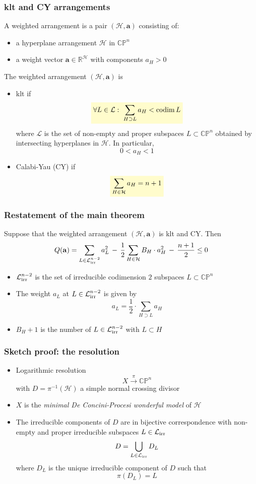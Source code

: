 \documentclass{beamer}
\newcommand{\R}{\mathbb{R}}
\newcommand{\CP}{\mathbb{CP}}
\newcommand{\mH}{\mathcal{H}}
\newcommand{\mL}{\mathcal{L}}
\newcommand{\ba}{\mathbf{a}}
\newcommand{\mLi}{\mathcal{L}_{\textup{irr}}}
\DeclareMathOperator{\codim}{codim}
\newcommand{\mathcolorbox}[2]{\colorbox{#1}{$\displaystyle #2$}}
\begin{document}
\begin{frame}
	\frametitle{klt and CY arrangements}
	A weighted arrangement is a pair \((\mH, \ba)\) consisting of:
	\begin{itemize}
		\item a hyperplane arrangement \(\mH\) in \(\CP^n\)
		\item a weight vector \(\ba \in \R^{\mH}\) with components \(a_H > 0\)
	\end{itemize}
	
	
	
	
	The weighted arrangement \((\mH, \ba)\) is
	\begin{itemize}
		\item  klt if
		\[
		\mathcolorbox{yellow!20}{
	\forall L \in \mL: \,\, \sum_{H \supset L} a_H < \codim L 	
	}
		\] 
		where \(\mL\) is the set of non-empty and proper subspaces \(L \subset \CP^n\) obtained by intersecting hyperplanes in \(\mH\).
		In particular, 
		\[0 < a_H < 1 \]
		\item  Calabi-Yau (CY) if
		\[
		\mathcolorbox{yellow!20}{
			\sum_{H \in \mH} a_H = n+1 	
		}
		\] 
	\end{itemize}
\end{frame}


\begin{frame}
	\frametitle{Restatement of the main theorem}
	\begin{theorem}
		Suppose that the weighted arrangement \((\mH, \ba)\) is klt and CY. Then
		\[
		Q(\ba) = \sum_{L \in \mLi^{n-2}} a_L^2 \,-\, \frac{1}{2} \sum_{H \in \mH} B_H \cdot a_H^2 \,-\, \frac{n+1}{2} \leq 0 
		\]
	\end{theorem}
\begin{itemize}
	\item \(\mLi^{n-2}\) is the set of irreducible codimension \(2\) subspaces \(L \subset \CP^n\)
	\item The weight \(a_L\) at \(L \in \mLi^{n-2}\) is given by
	\[
	a_L = \frac{1}{2} \cdot \sum_{H \supset L} a_H
	\]
	\item \(B_H + 1\) is the number of \(L \in \mLi^{n-2}\) with \(L \subset H\)
\end{itemize}
\end{frame}


\begin{frame}
	\frametitle{Sketch proof: the resolution}
	\begin{itemize}
		\item Logarithmic resolution
		\[
		X \xrightarrow{\pi} \CP^n
		\]
		with \(D = \pi^{-1}(\mH)\) a simple normal crossing divisor
		
		\item \(X\) is the \emph{minimal De Concini-Procesi wonderful model} of \(\mH\)
		
		\item The irreducible components of \(D\) are in bijective correspondence with non-empty and proper irreducible subspaces \(L \in \mLi\) 
		\[
		D = \bigcup_{L \in \mLi} D_L
		\]
		where \(D_L\) is the unique irreducible component of \(D\) such that 
		\[
		\pi(D_L) = L 
		\]
		
	\end{itemize}
\end{frame}
\end{document}
